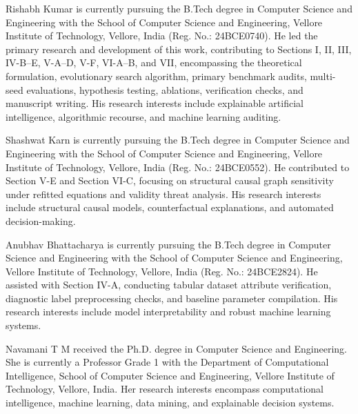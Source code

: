\documentclass[nolineno]{paper/ieee-access/ieeeaccess}%
\begin{document}
\begin{IEEEbiography}{Rishabh Kumar}
is currently pursuing the B.Tech degree in Computer Science and Engineering with the School of Computer Science and Engineering, Vellore Institute of Technology, Vellore, India (Reg. No.: 24BCE0740). He led the primary research and development of this work, contributing to Sections I, II, III, IV-B--E, V-A--D, V-F, VI-A--B, and VII, encompassing the theoretical formulation, evolutionary search algorithm, primary benchmark audits, multi-seed evaluations, hypothesis testing, ablations, verification checks, and manuscript writing. His research interests include explainable artificial intelligence, algorithmic recourse, and machine learning auditing.
\end{IEEEbiography}

\begin{IEEEbiography}{Shashwat Karn}
is currently pursuing the B.Tech degree in Computer Science and Engineering with the School of Computer Science and Engineering, Vellore Institute of Technology, Vellore, India (Reg. No.: 24BCE0552). He contributed to Section V-E and Section VI-C, focusing on structural causal graph sensitivity under refitted equations and validity threat analysis. His research interests include structural causal models, counterfactual explanations, and automated decision-making.
\end{IEEEbiography}

\begin{IEEEbiography}{Anubhav Bhattacharya}
is currently pursuing the B.Tech degree in Computer Science and Engineering with the School of Computer Science and Engineering, Vellore Institute of Technology, Vellore, India (Reg. No.: 24BCE2824). He assisted with Section IV-A, conducting tabular dataset attribute verification, diagnostic label preprocessing checks, and baseline parameter compilation. His research interests include model interpretability and robust machine learning systems.
\end{IEEEbiography}

\begin{IEEEbiography}{Navamani T M}
received the Ph.D. degree in Computer Science and Engineering. She is currently a Professor Grade 1 with the Department of Computational Intelligence, School of Computer Science and Engineering, Vellore Institute of Technology, Vellore, India. Her research interests encompass computational intelligence, machine learning, data mining, and explainable decision systems.
\end{IEEEbiography}

\EOD
\end{document}

